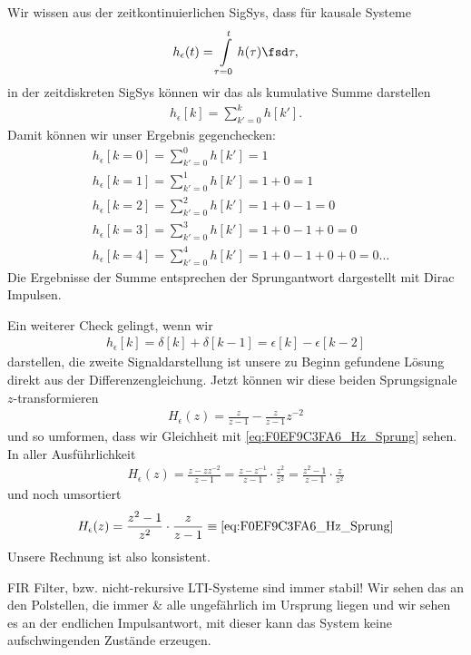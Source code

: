 \begin{Loesung}
Wir wissen aus der zeitkontinuierlichen SigSys, dass für kausale Systeme
\begin{align}
h_\epsilon(t) = \int\limits_{\tau=0}^{t} h(\tau) \fsd \tau,
\end{align}
in der zeitdiskreten SigSys können wir das als kumulative Summe darstellen
\begin{align}
h_\epsilon[k] = \sum\limits_{k'=0}^{k} h[k'].
\end{align}
%
Damit können wir unser Ergebnis gegenchecken:
%
\begin{align}
&h_\epsilon[k=0] = \sum\limits_{k'=0}^{0} h[k'] = 1\\
&h_\epsilon[k=1] = \sum\limits_{k'=0}^{1} h[k'] = 1 + 0 = 1\\
&h_\epsilon[k=2] = \sum\limits_{k'=0}^{2} h[k'] = 1 + 0 - 1 = 0\\
&h_\epsilon[k=3] = \sum\limits_{k'=0}^{3} h[k'] = 1 + 0 - 1 + 0 = 0\\
&h_\epsilon[k=4] = \sum\limits_{k'=0}^{4} h[k'] = 1 + 0 - 1 + 0 + 0 = 0\dots
\end{align}
%
Die Ergebnisse der Summe entsprechen der Sprungantwort dargestellt mit Dirac Impulsen.
%

Ein weiterer Check gelingt, wenn wir
\begin{align}
h_\epsilon[k] = \delta[k] + \delta[k-1] = \epsilon[k] - \epsilon[k-2]
\end{align}
darstellen, die zweite Signaldarstellung ist unsere zu Beginn gefundene Lösung direkt aus der Differenzengleichung.
%
Jetzt können wir diese beiden Sprungsignale $z$-transformieren
\begin{align}
H_\epsilon(z) = \frac{z}{z-1} - \frac{z}{z-1} z^{-2}
\end{align}
und so umformen, dass wir Gleichheit mit \eqref{eq:F0EF9C3FA6_Hz_Sprung} sehen.
%
In aller Ausführlichkeit
\begin{align}
H_\epsilon(z) = \frac{z- z z^{-2}}{z-1} = \frac{z- z^{-1}}{z-1} \cdot \frac{z^2}{z^2} =
\frac{z^2- 1}{z-1} \cdot \frac{z}{z^2}
\end{align}
und noch umsortiert
\begin{align}
H_\epsilon(z) = \frac{z^2- 1}{z^2} \cdot \frac{z}{z-1} \equiv \eqref{eq:F0EF9C3FA6_Hz_Sprung}
\end{align}
%
Unsere Rechnung ist also konsistent.

FIR Filter, bzw. nicht-rekursive LTI-Systeme sind immer stabil! Wir sehen das
an den Polstellen, die immer \& alle ungefährlich im Ursprung liegen und wir sehen es
an der endlichen Impulsantwort, mit dieser kann das System keine aufschwingenden
Zustände erzeugen.

\end{Loesung}
